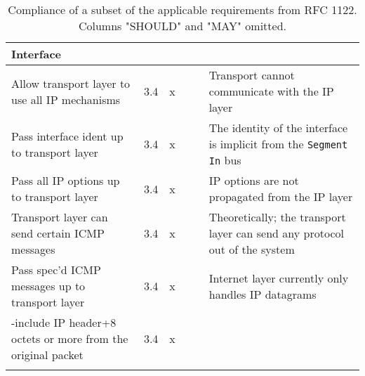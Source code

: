 \begin{longtable}{ | p{} | p{} | p{} |  p{} | p{} | p{} |}
\textbf{Interface} \\ \hline
  Allow transport layer to use all IP mechanisms &3.4     &x& & \cellcolor{red!25 } & Transport cannot communicate with the IP layer  \\ \hline
  Pass interface ident up to transport layer     &3.4     &x& & \cellcolor{yellow!25 } & The identity of the interface is implicit from the \texttt{Segment In} bus \\ \hline
  Pass all IP options up to transport layer      &3.4     &x& & \cellcolor{red!25 } & IP options are not propagated from the IP layer\\ \hline
  Transport layer can send certain ICMP messages &3.4     &x& & \cellcolor{yellow!25 } & Theoretically; the transport layer can send any protocol out of the system\\ \hline
  Pass spec'd ICMP messages up to transport layer  &3.4     &x& & \cellcolor{red!25 }& Internet layer currently only handles IP datagrams \\ \hline
   -include IP header+8 octets or more from the original packet  &3.4     &x& & \cellcolor{red!25 } & \\ \hline
\hline
\caption{Compliance of a subset of the applicable requirements from RFC 1122.
		Columns "SHOULD" and "MAY" omitted.}
\label{tab:rfc_compliance}
\end{longtable}


